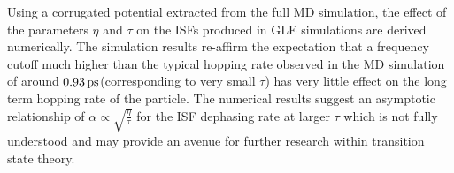 Using a corrugated potential extracted from the full MD simulation, the effect of the parameters $\eta$ and $\tau$ on the ISFs produced in GLE simulations are derived numerically. The simulation results re-affirm the expectation that a frequency cutoff much higher than the typical hopping rate observed in the MD simulation of around $\SI{0.93}{\ips}$(corresponding to very small $\tau$) has very little effect on the long term hopping rate of the particle. The numerical results suggest an asymptotic relationship of $\alpha \propto \sqrt{\frac{\eta}{\tau}}$ for the ISF dephasing rate at larger $\tau$ which is not fully understood and may provide an avenue for further research within transition state theory. 

